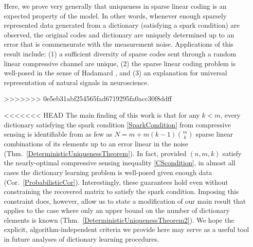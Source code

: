 \documentclass[9pt,twocolumn]{pnas-new}
\begin{document}
Here, we prove very generally that uniqueness in sparse linear coding is an expected property of the model.  In other words, whenever enough sparsely represented data generated from a dictionary (satisfying a spark condition) are observed, the original codes and dictionary are uniquely determined up to an error that is commensurate with the measurement noise.  Applications of this result include:  (1) a sufficient diversity of sparse codes sent through a random linear compressive channel are unique, (2) the sparse linear coding problem is well-posed in the sense of Hadamard \cite{Hadamard1902}, and (3) an explanation for universal representation of natural signals in neuroscience. 

>>>>>>> 0e5eb31abf254565fad6719295fa0acc30f8ddff

<<<<<<< HEAD
The main finding of this work is that for any $k < m$, every dictionary satisfying the spark condition \eqref{SparkCondition} from compressive sensing is identifiable from as few as $N = m + m(k-1){m \choose k}$ sparse linear combinations of its elements up to an error linear in the noise (Thm.~\ref{DeterministicUniquenessTheorem}). In fact, provided $(n, m, k)$ satisfy the nearly-optimal compressive sensing inequality \eqref{CScondition}, in almost all cases the dictionary learning problem is well-posed given enough data (Cor.~\ref{ProbabilisticCor}). Interestingly, these guarantees hold even without constraining the recovered matrix to satisfy the spark condition. Imposing this constraint does, however, allow us to state a modification of our main result that applies to the case where only an upper bound on the number of dictionary elements is known (Thm.~\ref{DeterministicUniquenessTheorem2}). We hope the explicit, algorithm-independent criteria we provide here may serve as a useful tool in future analyses of dictionary learning procedures.
\end{document}
